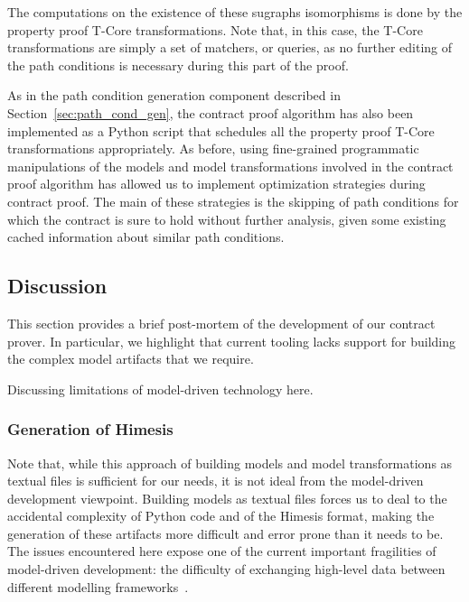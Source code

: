 The computations on the existence of these sugraphs isomorphisms is done by the
property proof T-Core transformations. Note
that, in this case, the T-Core transformations are simply a set of matchers, or
queries, as no further editing of the path conditions is necessary during this
part of the proof.

As in the path condition generation component described in
Section~\ref{sec:path_cond_gen}, the contract proof algorithm has also been
implemented as a Python script that schedules all the property proof T-Core
transformations appropriately. As before, using fine-grained programmatic
manipulations of the models and model transformations involved in the contract
proof algorithm has allowed us to implement optimization strategies during
contract proof. The main of these strategies is the skipping of path conditions
for which the contract is sure to hold without further analysis, given some
existing cached information about similar path conditions.

\subsection{Discussion}

This section provides a brief post-mortem of the development of our contract prover. In particular, we highlight that current tooling lacks support for building the complex model artifacts that we require.

Discussing limitations of model-driven technology here.


\subsubsection{Generation of Himesis}

Note that, while this approach of building models and model transformations as
textual files is sufficient for our needs, it is not ideal from the model-driven
development viewpoint. Building models as textual files forces us to deal to
the accidental complexity of Python code and of the Himesis format, making the
generation of these artifacts more difficult and error prone than it needs to
be. The issues encountered here expose one of the current important fragilities
of model-driven development: the difficulty of exchanging high-level data
between different modelling frameworks~.

